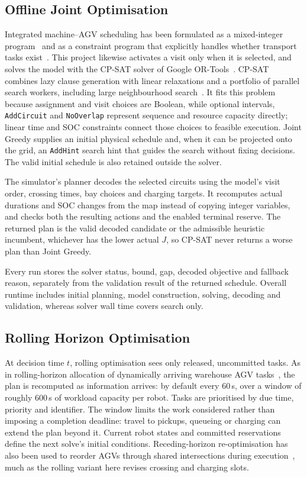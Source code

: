 \documentclass[11pt,a4paper]{article}
\newcommand{\code}[1]{\texttt{#1}}
\begin{document}
\subsection{Offline Joint Optimisation}

Integrated machine--AGV scheduling has been formulated as a mixed-integer program~\cite{yao2025milp}
and as a constraint program that explicitly handles whether transport tasks
exist~\cite{yao2026cp}. This project likewise activates a visit only when it is selected, and solves
the model with the CP-SAT solver of Google OR-Tools~\cite{cpsat}. CP-SAT combines lazy clause
generation with linear relaxations and a portfolio of parallel search workers, including large
neighbourhood search~\cite{perron2023cpsat}. It fits this problem because assignment and
visit choices are Boolean, while optional intervals, \code{AddCircuit} and \code{NoOverlap} represent
sequence and resource capacity directly; linear time and SOC constraints connect those choices to
feasible execution. Joint Greedy supplies an initial physical schedule and, when it can be projected
onto the grid, an \code{AddHint} search hint that guides the search without fixing decisions. The valid
initial schedule is also retained outside the solver.

The simulator's planner decodes the selected circuits using the model's visit order, crossing times,
bay choices and charging targets. It recomputes actual durations and SOC changes from the map instead of
copying integer variables, and checks both the resulting actions and the enabled terminal reserve. The
returned plan is the valid decoded candidate or the admissible heuristic incumbent, whichever has the
lower actual $J$, so CP-SAT never returns a worse plan than Joint Greedy.

Every run stores the solver status, bound, gap, decoded objective and fallback reason, separately from
the validation result of the returned schedule. Overall runtime includes initial planning, model
construction, solving, decoding and validation, whereas solver wall time covers search only.

\subsection{Rolling Horizon Optimisation}

At decision time $t$, rolling optimisation sees only released, uncommitted tasks. As in rolling-horizon
allocation of dynamically arriving warehouse AGV tasks~\cite{xin2024dynamic}, the plan is recomputed as
information arrives: by default every 60\,s, over a window of roughly 600\,s of workload capacity per
robot. Tasks are prioritised by due time, priority and identifier. The window limits the work
considered rather than imposing a completion deadline: travel to pickups, queueing or charging can
extend the plan beyond it. Current robot states and committed reservations define the next solve's
initial conditions. Receding-horizon re-optimisation has also been used to reorder AGVs through shared
intersections during execution~\cite{berndt2024receding}, much as the rolling variant here
revises crossing and charging slots.
\end{document}
